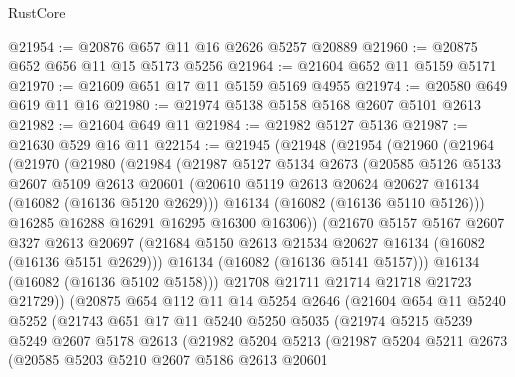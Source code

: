 \begin{lexlean}{RustCore}
\begin{coremodule}
@21954 := @20876 @657 @11 @16 @2626 @5257 @20889
@21960 := @20875 @652 @656 @11 @15 @5173 @5256
@21964 := @21604 @652 @11 @5159 @5171
@21970 := @21609 @651 @17 @11 @5159 @5169 @4955
@21974 := @20580 @649 @619 @11 @16
@21980 := @21974 @5138 @5158 @5168 @2607 @5101 @2613
@21982 := @21604 @649 @11
@21984 := @21982 @5127 @5136
@21987 := @21630 @529 @16 @11
@22154 := @21945
    (@21948
      (@21954
        (@21960
          (@21964
            (@21970
              (@21980
                (@21984
                  (@21987
                    @5127
                    @5134
                    @2673
                    (@20585
                      @5126
                      @5133
                      @2607
                      @5109
                      @2613
                      @20601
                      (@20610 @5119 @2613 @20624 @20627 @16134 (@16082 (@16136 @5120 @2629)))
                      @16134
                      (@16082 (@16136 @5110 @5126)))
                    @16285
                    @16288
                    @16291
                    @16295
                    @16300
                    @16306))
                (@21670
                  @5157
                  @5167
                  @2607
                  @327
                  @2613
                  @20697
                  (@21684 @5150 @2613 @21534 @20627 @16134 (@16082 (@16136 @5151 @2629)))
                  @16134
                  (@16082 (@16136 @5141 @5157)))
                @16134
                (@16082 (@16136 @5102 @5158)))
              @21708
              @21711
              @21714
              @21718
              @21723
              @21729))
          (@20875
            @654
            @112
            @11
            @14
            @5254
            @2646
            (@21604
              @654
              @11
              @5240
              @5252
              (@21743
                @651
                @17
                @11
                @5240
                @5250
                @5035
                (@21974
                  @5215
                  @5239
                  @5249
                  @2607
                  @5178
                  @2613
                  (@21982
                    @5204
                    @5213
                    (@21987
                      @5204
                      @5211
                      @2673
                      (@20585
                        @5203
                        @5210
                        @2607
                        @5186
                        @2613
                        @20601

\end{coremodule}
\end{lexlean}
